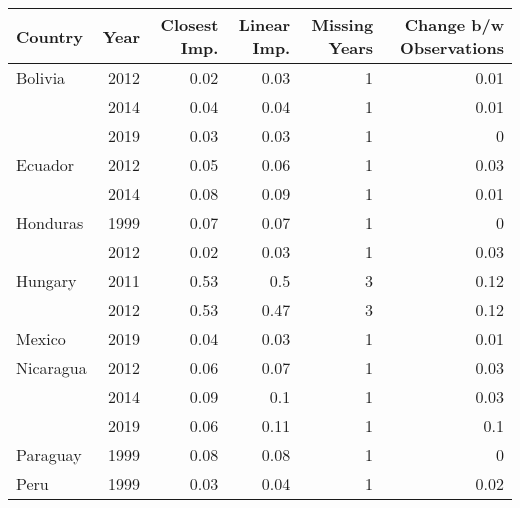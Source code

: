 \begin{longtable}{lrrrrr}
\toprule
Country  & Year  & Closest Imp. & Linear Imp. & Missing Years & Change b/w Observations \\ 
\midrule\addlinespace[2.5pt]
Bolivia & 2012 & 0.02 & 0.03 & 1 & 0.01 \\ 
 & 2014 & 0.04 & 0.04 & 1 & 0.01 \\ 
 & 2019 & 0.03 & 0.03 & 1 & 0 \\ 
Ecuador & 2012 & 0.05 & 0.06 & 1 & 0.03 \\ 
 & 2014 & 0.08 & 0.09 & 1 & 0.01 \\ 
Honduras & 1999 & 0.07 & 0.07 & 1 & 0 \\ 
 & 2012 & 0.02 & 0.03 & 1 & 0.03 \\ 
Hungary & 2011 & 0.53 & 0.5 & 3 & 0.12 \\ 
 & 2012 & 0.53 & 0.47 & 3 & 0.12 \\ 
Mexico & 2019 & 0.04 & 0.03 & 1 & 0.01 \\ 
Nicaragua & 2012 & 0.06 & 0.07 & 1 & 0.03 \\ 
 & 2014 & 0.09 & 0.1 & 1 & 0.03 \\ 
 & 2019 & 0.06 & 0.11 & 1 & 0.1 \\ 
Paraguay & 1999 & 0.08 & 0.08 & 1 & 0 \\ 
Peru & 1999 & 0.03 & 0.04 & 1 & 0.02 \\ 
\bottomrule
\end{longtable}


